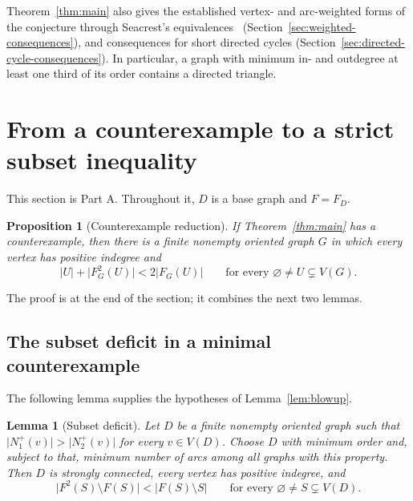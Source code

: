 \documentclass[11pt]{article}
\newtheorem{lemma}[theorem]{Lemma}
\newtheorem{proposition}[theorem]{Proposition}
\theoremstyle{remark}
\newcommand{\abs}[1]{\lvert #1\rvert}
\begin{document}
Theorem~\ref{thm:main} also gives the established vertex- and arc-weighted
forms of the conjecture through Seacrest's
equivalences~\cite{Seacrest2015} (Section~\ref{sec:weighted-consequences}),
and consequences for short directed cycles
(Section~\ref{sec:directed-cycle-consequences}).  In particular, a graph with
minimum in- and outdegree at least one third of its order contains a directed
triangle.

\section{From a counterexample to a strict subset inequality}
\label{sec:reduction}

This section is Part A.  Throughout it, $D$ is a base graph and $F=F_D$.

\begin{proposition}[Counterexample reduction]
\label{prop:counterexample-reduction}
If Theorem~\ref{thm:main} has a counterexample, then there is a finite
nonempty oriented graph $G$ in which every vertex has positive indegree
and
\begin{equation}
\label{eq:strict-subset-growth}
  \abs{U}+\abs{F_G^2(U)}<2\abs{F_G(U)}
  \qquad\text{for every }\varnothing\ne U\subsetneq V(G).
\end{equation}
\end{proposition}

The proof is at the end of the section; it combines the next two lemmas.

\subsection{The subset deficit in a minimal counterexample}

The following lemma supplies the hypotheses of Lemma~\ref{lem:blowup}.

\begin{lemma}[Subset deficit]
\label{lem:subset-deficit}
Let $D$ be a finite nonempty oriented graph such that
$\abs{N_1^+(v)}>\abs{N_2^+(v)}$ for every $v\in V(D)$.
Choose $D$ with minimum order and, subject to that, minimum number of
arcs among all graphs with this property.  Then $D$ is strongly connected,
every vertex has positive indegree, and
\begin{equation}
\label{eq:subset-deficit}
  \abs{F^2(S)\setminus F(S)}<\abs{F(S)\setminus S}
  \qquad\text{for every }\varnothing\ne S\subsetneq V(D).
\end{equation}
\end{lemma}
\end{document}
